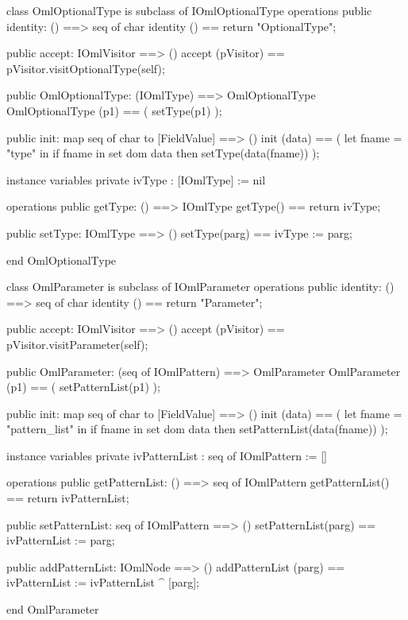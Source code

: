 \begin{vdm_al}
class OmlOptionalType is subclass of IOmlOptionalType
operations
  public identity: () ==> seq of char
  identity () == return "OptionalType";

  public accept: IOmlVisitor ==> ()
  accept (pVisitor) == pVisitor.visitOptionalType(self);

  public OmlOptionalType:
      (IOmlType) ==> OmlOptionalType
  OmlOptionalType (p1) == 
   ( setType(p1) );

  public init: map seq of char to [FieldValue] ==> ()
  init (data) ==
    ( let fname = "type" in
        if fname in set dom data
        then setType(data(fname)) );

instance variables
  private ivType : [IOmlType] := nil

operations
  public getType: () ==> IOmlType
  getType() == return ivType;

  public setType: IOmlType ==> ()
  setType(parg) == ivType := parg;

end OmlOptionalType
\end{vdm_al}

\begin{vdm_al}
class OmlParameter is subclass of IOmlParameter
operations
  public identity: () ==> seq of char
  identity () == return "Parameter";

  public accept: IOmlVisitor ==> ()
  accept (pVisitor) == pVisitor.visitParameter(self);

  public OmlParameter:
      (seq of IOmlPattern) ==> OmlParameter
  OmlParameter (p1) == 
   ( setPatternList(p1) );

  public init: map seq of char to [FieldValue] ==> ()
  init (data) ==
    ( let fname = "pattern_list" in
        if fname in set dom data
        then setPatternList(data(fname)) );

instance variables
  private ivPatternList : seq of IOmlPattern := []

operations
  public getPatternList: () ==> seq of IOmlPattern
  getPatternList() == return ivPatternList;

  public setPatternList: seq of IOmlPattern ==> ()
  setPatternList(parg) == ivPatternList := parg;

  public addPatternList: IOmlNode ==> ()
  addPatternList (parg) == ivPatternList := ivPatternList ^ [parg];

end OmlParameter
\end{vdm_al}

